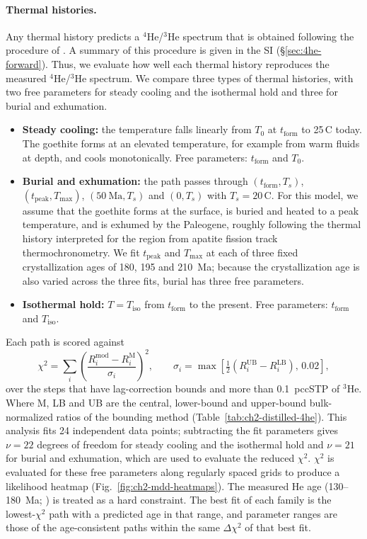 \paragraph{Thermal histories.}
Any thermal history predicts a $^4$He/$^3$He spectrum that is obtained following the procedure
of \citet{shusterfarley2004}. A summary of this procedure is given in the SI (\S\ref{sec:4he-forward}). Thus, we evaluate 
how well each thermal history reproduces the measured $^4$He/$^3$He spectrum.
We compare three types of thermal histories, with two free parameters for steady cooling and the isothermal hold and three for burial and exhumation. 
\begin{itemize}
  \item \textbf{Steady cooling:} the temperature falls linearly from $T_0$ at
  $t_\mathrm{form}$ to 25\,\textdegree C today. The goethite forms at an elevated
  temperature, for example from warm fluids at depth, and cools monotonically. Free
  parameters: $t_\mathrm{form}$ and $T_0$.
  \item \textbf{Burial and exhumation:} the path passes through $(t_\mathrm{form},T_s)$,
  $(t_\mathrm{peak},T_\mathrm{max})$, $(50~\mathrm{Ma},T_s)$ and $(0,T_s)$ with
  $T_s=20$\,\textdegree C. For this model, we assume that the goethite forms at the surface, 
  is buried and heated to a peak temperature, and is exhumed by the Paleogene, roughly following 
  the thermal history \citep{gibsonstuwe2000,mitchell1998} interpreted for the region from apatite fission track thermochronometry. We fit
  $t_\mathrm{peak}$ and $T_\mathrm{max}$ at each of three fixed crystallization ages of 180, 195 and
  210~Ma; because the crystallization age is also varied across the three fits, burial has three free parameters.
  \item \textbf{Isothermal hold:} $T=T_\mathrm{iso}$ from $t_\mathrm{form}$ to the
  present. Free parameters: $t_\mathrm{form}$ and $T_\mathrm{iso}$.
\end{itemize}
Each path is scored against
\begin{equation}
  \chi^2=\sum_i\left(\frac{R_i^{\mathrm{mod}}-R_i^{\mathrm{M}}}{\sigma_i}\right)^2,
  \qquad\sigma_i=\max\!\left[\tfrac12\left(R_i^{\mathrm{UB}}-R_i^{\mathrm{LB}}\right),\,0.02\right],
  \label{eq:gt_mdd_chi2}
\end{equation}
over the \MDDNfit{} steps that have lag-correction bounds and more than 0.1~pccSTP of
$^3$He. Where M, LB and UB are the central, lower-bound and upper-bound
bulk-normalized ratios of the bounding method (Table~\ref{tab:ch2-distilled-4he}).
This analysis fits 24 independent data points; subtracting the fit parameters gives $\nu=22$ degrees of freedom for steady cooling and the isothermal hold and $\nu=21$ for burial and exhumation, which are used to evaluate the reduced $\chi^2$.
$\chi^2$ is evaluated for these free parameters along regularly spaced grids to produce a likelihood heatmap (Fig.~\ref{fig:ch2-mdd-heatmaps}). 
The measured He age (130--180~Ma; \citealt{waltenberg2012}) is treated as a hard constraint. The best fit of each family is
the lowest-$\chi^2$ path with a predicted age in that range, and parameter ranges are those
of the age-consistent paths within the same $\Delta\chi^2$ of that best fit.

